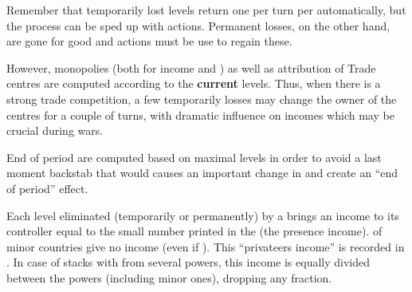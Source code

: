 \begin{playtip}
  Remember that temporarily lost levels return one per turn per \TradeFLEET
  automatically, but the process can be sped up with \TFI actions. Permanent
  losses, on the other hand, are gone for good and \TFI actions must be use to
  regain these.

  However, monopolies (both for income and \VPs) as well as attribution of
  Trade centres are computed according to the \textbf{current} levels. Thus,
  when there is a strong trade competition, a few temporarily losses may
  change the owner of the centres for a couple of turns, with dramatic
  influence on incomes which may be crucial during wars.

  End of period \VPs are computed based on maximal levels in order to avoid a
  last moment backstab that would causes an important change in \VPs and
  create an ``end of period'' effect.
\end{playtip}

 Each level eliminated (temporarily or
permanently) by a \corsaire brings an income to its controller equal to the
small number printed in the \STZ (the presence income). \corsaire of minor
countries give no income (even if \VASSAL).
\bparag This ``privateers income'' is recorded in .
\bparag In case of stacks with \corsaire from several powers, this income is
equally divided between the powers (including minor ones), dropping any
fraction.

